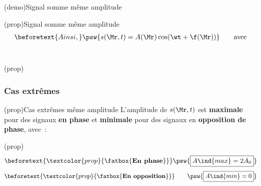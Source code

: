 \documentclass[../../main/main.tex]{subfiles}
\begin{document}
\begin{tcb*}[breakable](demo){Signal somme même amplitude}
	\vspace{-15pt}
\end{tcb*}

\begin{tcb}(prop){Signal somme même amplitude}
	\vspace{-15pt}
	\begin{gather*}
		\beforetext{Ainsi,}
		\psw{s(\Mr,t) = A(\Mr)\cos(\wt + \f(\Mr))}
		\tag*{avec}
	\end{gather*}
	~
	\vspace{-15pt}
	\smallbreak
	\begin{isd}(prop)
		\psw{%
			\[
				\boxed{A(\Mr) = 2A_0 \cos(\frac{\Delta{\f_{2/1}(\Mr)}}{2})}
			\]
		}%
		\vspace{-15pt}
		\tcblower
		\psw{%
			\[
				\boxed{\f(\Mr) = \frac{\f_1(\Mr)+\f_2(\Mr)}{2}}
			\]
		}%
		\vspace{-15pt}
	\end{isd}
\end{tcb}

\vspace{-10pt}
\subsubsection{Cas extrêmes}
\begin{tcb*}(prop){Cas extrêmes même amplitude}
	L'amplitude de $s(\Mr,t)$ est \textbf{maximale} pour des signaux \textbf{en phase}
	et \textbf{minimale} pour des signaux en \textbf{opposition de phase}, avec~:
	\smallbreak
	\begin{isd}(prop)
		\vspace{-15pt}
		\begin{gather*}
			\beforetext{\textcolor{prop}{\fatbox{\textbf{En phase}}}}
			\psw{\boxed{A\ind{max} = 2A_0}}
		\end{gather*}
		\vspace{-15pt}
		\tcblower
		\vspace{-15pt}
		\begin{gather*}
			\beforetext{\textcolor{prop}{\fatbox{\textbf{En opposition}}}}
			\qquad
			\psw{\boxed{A\ind{min} = 0}}
		\end{gather*}
		\vspace{-15pt}
	\end{isd}
\end{tcb*}
\end{document}
